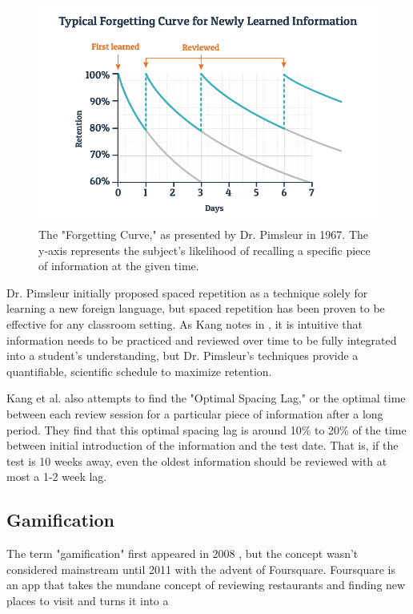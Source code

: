\begin{figure}[h]
	\includegraphics[width=1.0\linewidth]{figures/forgetting-curve}
	\caption{The "Forgetting Curve," as presented by Dr. Pimsleur in 1967. The y-axis represents the subject's likelihood of recalling a specific piece of information at the given time.}
	\label{fig:forgetting-curve}
\end{figure}

\par Dr. Pimsleur initially proposed spaced repetition as a technique solely for learning a new foreign language, but spaced repetition has been proven to be effective for any classroom setting. As Kang notes in \cite{fiske2016spaced}, it is intuitive that information needs to be practiced and reviewed over time to be fully integrated into a student's understanding, but Dr. Pimsleur's techniques provide a quantifiable, scientific schedule to maximize retention.

\par Kang et al. \cite{fiske2016spaced} also attempts to find the "Optimal Spacing Lag," or the optimal time between each review session for a particular piece of information after a long period. They find that this optimal spacing lag is around 10\% to 20\% of the time between initial introduction of the information and the test date. That is, if the test is 10 weeks away, even the oldest information should be reviewed with at most a 1-2 week lag.

\subsection{Gamification}
\par The term "gamification" first appeared in 2008 \cite{Deterding:2011:GDE:2181037.2181040}, but the concept wasn't considered mainstream until 2011 with the advent of Foursquare. Foursquare is an app that takes the mundane concept of reviewing restaurants and finding new places to visit and turns it into a 



